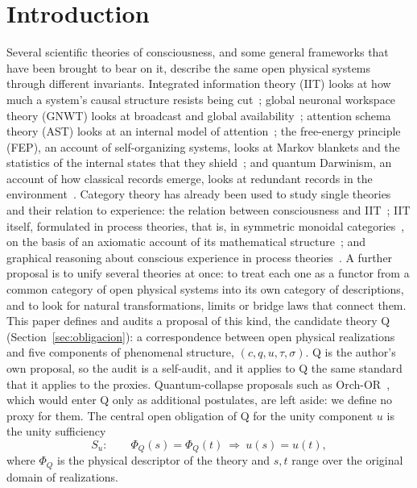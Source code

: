 \section{Introduction}\label{sec:intro}
Several scientific theories of consciousness, and some general frameworks that have been brought to bear on it, describe the same open physical systems through different invariants. Integrated information theory (IIT) looks at how much a system's causal structure resists being cut~\cite{Oizumi2014}; global neuronal workspace theory (GNWT) looks at broadcast and global availability~\cite{DehaeneChangeux2011}; attention schema theory (AST) looks at an internal model of attention~\cite{GrazianoKastner2011}; the free-energy principle (FEP), an account of self-organizing systems, looks at Markov blankets and the statistics of the internal states that they shield~\cite{Friston2013}; and quantum Darwinism, an account of how classical records emerge, looks at redundant records in the environment~\cite{Zurek2009}. Category theory has already been used to study single theories and their relation to experience: the relation between consciousness and IIT~\cite{Northoff2019,Tsuchiya2016}; IIT itself, formulated in process theories, that is, in symmetric monoidal categories~\cite{TullKleiner2021}, on the basis of an axiomatic account of its mathematical structure~\cite{KleinerTull2021}; and graphical reasoning about conscious experience in process theories~\cite{SignorelliWangCoecke2021}. A further proposal is to unify several theories at once: to treat each one as a functor from a common category of open physical systems into its own category of descriptions, and to look for natural transformations, limits or bridge laws that connect them. This paper defines and audits a proposal of this kind, the candidate theory Q (Section~\ref{sec:obligacion}): a correspondence between open physical realizations and five components of phenomenal structure, $(c,q,u,\tau,\sigma)$. Q is the author's own proposal, so the audit is a self-audit, and it applies to Q the same standard that it applies to the proxies. Quantum-collapse proposals such as Orch-OR~\cite{HameroffPenrose2014}, which would enter Q only as additional postulates, are left aside: we define no proxy for them. The central open obligation of Q for the unity component $u$ is the unity sufficiency
\begin{equation}\label{eq:Su}
S_u:\qquad \Phi_Q(s)=\Phi_Q(t)\ \Longrightarrow\ u(s)=u(t),
\end{equation}
where $\Phi_Q$ is the physical descriptor of the theory and $s,t$ range over the original domain of realizations.

